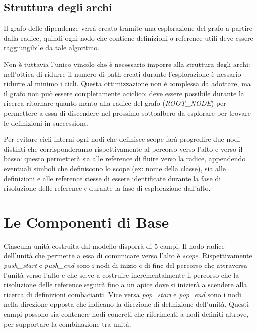 \subsection{Struttura degli archi}

Il grafo delle dipendenze verr\`a creato tramite una esplorazione del grafo a partire dalla radice, quindi ogni nodo che contiene definizioni o reference utili deve essere raggiungibile da tale algoritmo.

\par
Non \`e tuttavia l'unico vincolo che \`e necessario imporre alla struttura degli archi: nell'ottica di ridurre il numero di path creati durante l'esplorazione \`e nessario ridurre al minimo i cicli.
Questa ottimizzazione non \`e complessa da adottare, ma il grafo non pu\`o essere completamente aciclico: deve essere possibile durante la ricerca ritornare quanto mento alla radice del grafo (\emph{ROOT\_NODE}) per permettere a essa di discendere nel prossimo sottoalbero da esplorare per trovare le definizioni in successione.

\par
Per evitare cicli interni ogni nodi che definisce scope far\`a progredire due nodi distinti che corrisponderanno rispettivamente al percorso verso l'alto e verso il basso: questo permetter\`a sia alle reference di fluire verso la radice, appendendo eventuali simboli che definiscono lo scope (ex: nome della classe), sia alle definizioni e alle reference stesse di essere identificate durante la fase di risoluzione delle reference e durante la fase di esplorazione dall'alto.

\section{Le Componenti di Base}

Ciascuna unit\`a costruita dal modello disporr\`a di 5 campi.
Il nodo radice dell'unit\`a che permette a essa di comunicare verso l'alto \`e \emph{scope}.
Rispettivamente \emph{push\_start} e \emph{push\_end} sono i nodi di inizio e di fine del percorso che attraversa l'unit\`a verso l'alto e che serve a costruire incrementalmente il percorso che la risoluzione delle reference seguir\`a fino a un apice dove si inizier\`a a scendere alla ricerca di definizioni combacianti.
Vice versa \emph{pop\_start} e \emph{pop\_end} sono i nodi nella direzione opposta che indicano la direzione di definizione dell'unit\`a.
Questi campi possono sia contenere nodi concreti che riferimenti a nodi definiti altrove, per supportare la combinazione tra unit\`a.

